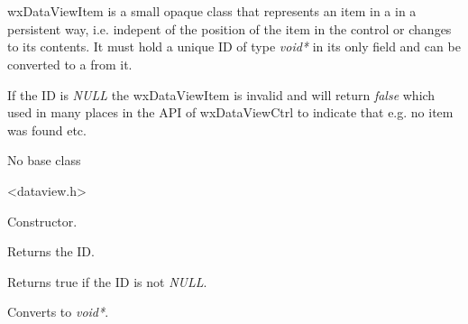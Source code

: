 
\section{}\label{wxdataviewitem}

wxDataViewItem is a small opaque class that represents an
item in a  in a
persistent way, i.e. indepent of the position of the
item in the control or changes to its contents. It must
hold a unique ID of type {\it void*} in its only field
and can be converted to a from it. 

If the ID is {\it NULL} the wxDataViewItem is invalid and 
 will return {\it false}
which used in many places in the API of wxDataViewCtrl
to indicate that e.g. no item was found etc.


No base class


<dataview.h>




\label{wxdataviewitemwxdataviewitem}


Constructor.



\label{wxdataviewitemgetid}


Returns the ID.

\label{wxdataviewitemisok}


Returns true if the ID is not {\it NULL}.

\label{wxdataviewitemvoid}


Converts to {\it void*}.
